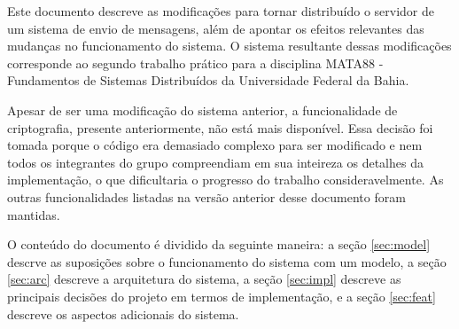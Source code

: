 \documentclass[../main.tex]{subfiles}
\begin{document}
Este documento descreve as modificações para tornar distribuído o servidor de um sistema de envio de mensagens, além de apontar os efeitos relevantes das mudanças no funcionamento do sistema.
O sistema resultante dessas modificações corresponde ao segundo trabalho prático para a disciplina MATA88 - Fundamentos de Sistemas Distribuídos da Universidade Federal da Bahia.

Apesar de ser uma modificação do sistema anterior, a funcionalidade de criptografia, presente anteriormente, não está mais disponível.
Essa decisão foi tomada porque o código era demasiado complexo para ser modificado e nem todos os integrantes do grupo compreendiam em sua inteireza os detalhes da implementação, o que dificultaria o progresso do trabalho consideravelmente.
As outras funcionalidades listadas na versão anterior desse documento foram mantidas.

O conteúdo do documento é dividido da seguinte maneira: a seção \ref{sec:model} descrve as suposições sobre o funcionamento do sistema com um modelo, a seção \ref{sec:arc} descreve a arquitetura do sistema, a seção \ref{sec:impl} descreve as principais decisões do projeto em termos de implementação, e a seção \ref{sec:feat} descreve os aspectos adicionais do sistema.
\end{document}
